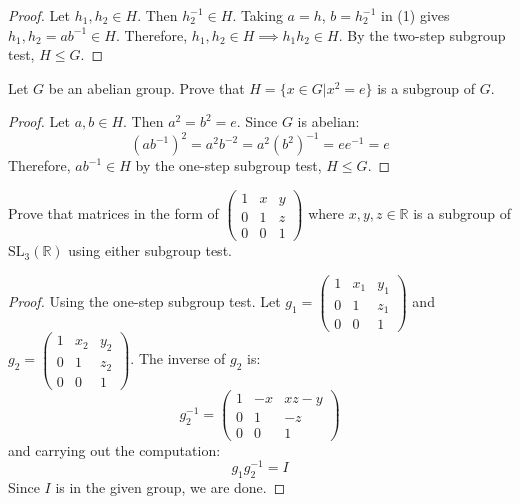 \begin{itemize}
\begin{proof}
        Let $h_1,h_2 \in H$. Then $h_2^{-1} \in H$. Taking $a=h$, $b=h_2^{-1}$ in (1) gives $h_1,h_2 = ab^{-1} \in H$. Therefore, $h_1,h_2 \in H \implies h_1h_2 \in H$. By the two-step subgroup test, $H \leq G$.
    \end{proof}
    \begin{example}
        Let $G$ be an abelian group. Prove that $H=\{x \in G | x^2 = e\}$ is a subgroup of $G$.
        \begin{proof}
            Let $a,b \in H$. Then $a^2=b^2=e$. Since $G$ is abelian:
            \begin{equation}
                (ab^{-1})^2 = a^2b^{-2} = a^2(b^2)^{-1} = ee^{-1} = e
            \end{equation}
            Therefore, $ab^{-1} \in H$ by the one-step subgroup test, $H \leq G$.
        \end{proof}
    \end{example}
    \begin{example}
        Prove that matrices in the form  of $\begin{pmatrix}
            1&x&y \\ 0 & 1 & z \\ 0 & 0 & 1
        \end{pmatrix}$ where $x,y,z \in \mathbb{R}$ is a subgroup of $\text{SL}_3(\mathbb{R})$ using either subgroup test.
        \begin{proof}
            Using the one-step subgroup test. Let $g_1 = \begin{pmatrix}
                1&x_1&y_1 \\ 0 & 1 & z_1 \\ 0 & 0 & 1 \end{pmatrix}$ and $g_2 = \begin{pmatrix}
            1&x_2&y_2 \\ 0 & 1 & z_2 \\ 0 & 0 & 1
        \end{pmatrix}$. The inverse of $g_2$ is:
        \begin{equation}
            g_2^{-1} = \begin{pmatrix}
                1 & -x &  xz-y \\ 
                0 & 1 & -z \\ 
                0 & 0 & 1
            \end{pmatrix}
        \end{equation}
        and carrying out the computation:
        \begin{equation}
            g_1g_2^{-1} = I
        \end{equation}
        Since $I$ is in the given group, we are done.
        \end{proof}
    \end{example}
\end{itemize}